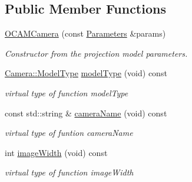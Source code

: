 \subsection*{Public Member Functions}
\begin{DoxyCompactItemize}
\item 
\mbox{\label{classcamodocal_1_1OCAMCamera_ae06f868418ac45ea94a6d8ecf98caaa0}} 
\hyperlink{classcamodocal_1_1OCAMCamera_ae06f868418ac45ea94a6d8ecf98caaa0}{O\+C\+A\+M\+Camera} (const \hyperlink{classcamodocal_1_1OCAMCamera_1_1Parameters}{Parameters} \&params)
\begin{DoxyCompactList}\small\item\em Constructor from the projection model parameters. \end{DoxyCompactList}\item 
\mbox{\label{classcamodocal_1_1OCAMCamera_a149e69010e4f53c978e5e9f4b1ef120d}} 
\hyperlink{classcamodocal_1_1Camera_a663bb19b7b1f38f6d1b7eeb0890183ff}{Camera\+::\+Model\+Type} \hyperlink{classcamodocal_1_1OCAMCamera_a149e69010e4f53c978e5e9f4b1ef120d}{model\+Type} (void) const
\begin{DoxyCompactList}\small\item\em virtual type of function model\+Type \end{DoxyCompactList}\item 
\mbox{\label{classcamodocal_1_1OCAMCamera_aff01e3fda8f1572771cc5ebd02dca383}} 
const std\+::string \& \hyperlink{classcamodocal_1_1OCAMCamera_aff01e3fda8f1572771cc5ebd02dca383}{camera\+Name} (void) const
\begin{DoxyCompactList}\small\item\em virtual type of funtion camera\+Name \end{DoxyCompactList}\item 
\mbox{\label{classcamodocal_1_1OCAMCamera_ae1fc6c03b577465a270bd986f3408acd}} 
int \hyperlink{classcamodocal_1_1OCAMCamera_ae1fc6c03b577465a270bd986f3408acd}{image\+Width} (void) const
\begin{DoxyCompactList}\small\item\em virtual type of function image\+Width \end{DoxyCompactList}\item 

\end{DoxyCompactItemize}
